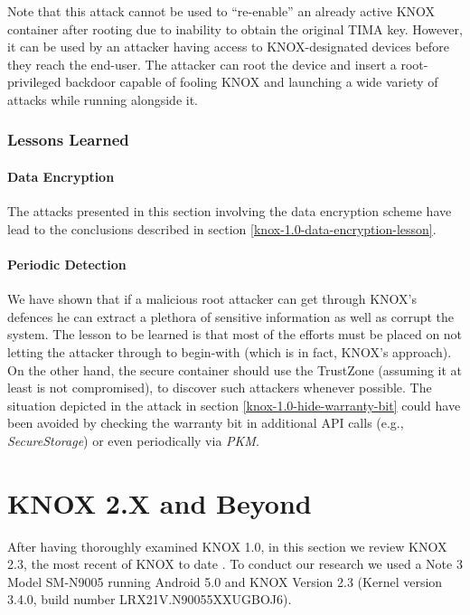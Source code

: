 \documentclass[11pt]{article}
\begin{document}
Note that this attack cannot be used to ``re-enable'' an already active KNOX container after rooting due to
inability to obtain the original TIMA key. However, it can be used by an attacker having access to KNOX-designated devices before they reach the end-user. 
The attacker can root the device and insert a root-privileged backdoor capable of fooling KNOX and launching a wide variety of attacks while running 
alongside it.

\subsubsection{Lessons Learned}
\paragraph{Data Encryption}
The attacks presented in this section involving the data encryption scheme have lead to the conclusions described in section \ref{knox-1.0-data-encryption-lesson}. 

\paragraph{Periodic Detection}
We have shown that if a malicious root attacker can get through KNOX's defences he can extract a plethora of sensitive information 
as well as corrupt the system. The lesson to be learned is that most of the efforts must be placed on not letting the attacker through to begin-with 
(which is in fact, KNOX's approach). 
On the other hand, the secure container should use the TrustZone (assuming it at least is not compromised), to discover such attackers whenever possible.
The situation depicted in the attack in section \ref{knox-1.0-hide-warranty-bit} could have been avoided by checking the warranty bit in additional API 
calls (e.g., \emph{SecureStorage}) or even periodically via \emph{PKM}.

\section{KNOX 2.X and Beyond} \label{knox-2.x}
After having thoroughly examined KNOX 1.0, in this section we review KNOX 2.3, the most recent of KNOX to date \cite{SamsungKNOX2Announcement}. 
To conduct our research we used a Note 3 Model SM-N9005 running Android 5.0 and KNOX Version 2.3 (Kernel version 3.4.0, build number LRX21V.N90055XXUGBOJ6).
\end{document}
